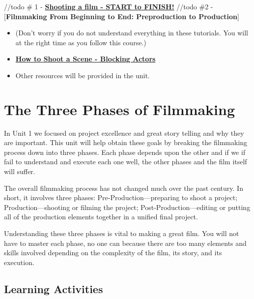 \documentclass[
]{book}
\begin{document}
//todo \# 1
- \href{https://www.youtube.com/watch?v=8NCLf9rF6IQ}{\textbf{Shooting a film - START to FINISH!}}
//todo \#2
- {[}\textbf{Filmmaking From Beginning to End: Preproduction to Production}{]}

\begin{itemize}
\item
  (Don't worry if you do not understand everything in these tutorials. You will at the right time as you follow this course.)
\item
  \href{https://www.youtube.com/watch?v=y9_LW5H2EC4}{\textbf{How to Shoot a Scene - Blocking Actors}}
\item
  Other resources will be provided in the unit.
\end{itemize}

\hypertarget{the-three-phases-of-filmmaking}{%
\section{The Three Phases of Filmmaking}\label{the-three-phases-of-filmmaking}}

In Unit 1 we focused on project excellence and great story telling and why they are important. This unit will help obtain these goals by breaking the filmmaking process down into three phases. Each phase depends upon the other and if we if fail to understand and execute each one well, the other phases and the film itself will suffer.

The overall filmmaking process has not changed much over the past century. In short, it involves three phases: Pre-Production---preparing to shoot a project; Production---shooting or filming the project; Post-Production---editing or putting all of the production elements together in a unified final project.

Understanding these three phases is vital to making a great film. You will not have to master each phase, no one can because there are too many elements and skills involved depending on the complexity of the film, its story, and its execution.

\hypertarget{learning-activities-5}{%
\subsection*{Learning Activities}\label{learning-activities-5}}
\end{document}
